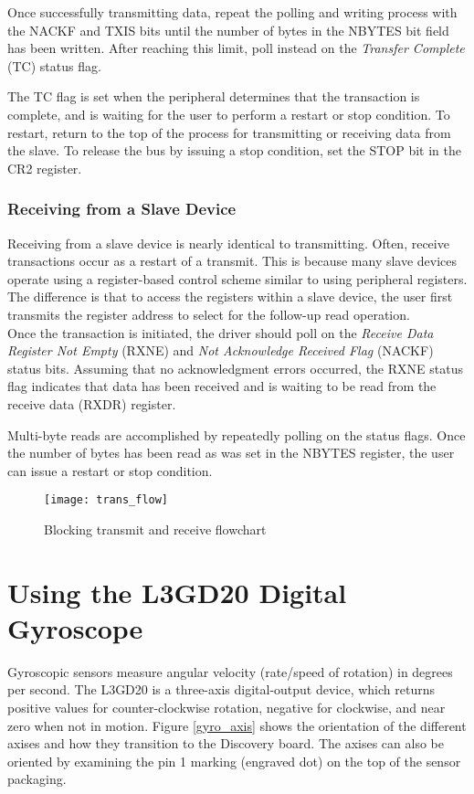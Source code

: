\documentclass[openany,11pt,fleqn]{book} %
\begin{document}
        Once successfully transmitting data, repeat the polling and writing process with the NACKF and TXIS bits until the number of bytes in the NBYTES bit field has been written. After reaching this limit, poll instead on the \textit{Transfer Complete} (TC) status flag. 
        
        The TC flag is set when the peripheral determines that the transaction is complete, and is waiting for the user to perform a restart or stop condition. To restart, return to the top of the process for transmitting or receiving data from the slave. To release the bus by issuing a stop condition, set the STOP bit in the CR2 register.  
    
    \subsubsection{Receiving from a Slave Device}
        Receiving from a slave device is nearly identical to transmitting. Often, receive transactions occur as a restart of a transmit. This is because many slave devices operate using a register-based control scheme similar to using peripheral registers. The difference is that to access the registers within a slave device, the user first transmits the register address to select for the follow-up read operation. \\
        
        Once the transaction is initiated, the driver should poll on the \textit{Receive Data Register Not Empty} (RXNE) and \textit{Not Acknowledge Received Flag} (NACKF) status bits. Assuming that no acknowledgment errors occurred, the RXNE status flag indicates that data has been received and is waiting to be read from the receive data (RXDR) register.  
        
        Multi-byte reads are accomplished by repeatedly polling on the status flags. Once the number of bytes has been read as was set in the NBYTES register, the user can issue a restart or stop condition.  
    
    \begin{figure}[]
       \centering\texttt{[image: trans\_flow]}
       \caption{Blocking transmit and receive flowchart}
       \label{trans_flow}
    \end{figure}

\section{Using the L3GD20 Digital Gyroscope}
Gyroscopic sensors measure angular velocity (rate/speed of rotation) in degrees per second. The L3GD20 is a three-axis digital-output device, which returns positive values for counter-clockwise rotation, negative for clockwise, and near zero when not in motion. Figure \ref{gyro_axis} shows the orientation of the different axises and how they transition to the Discovery board. The axises can also be oriented by examining the pin 1 marking (engraved dot) on the top of the sensor packaging.  
\end{document}
